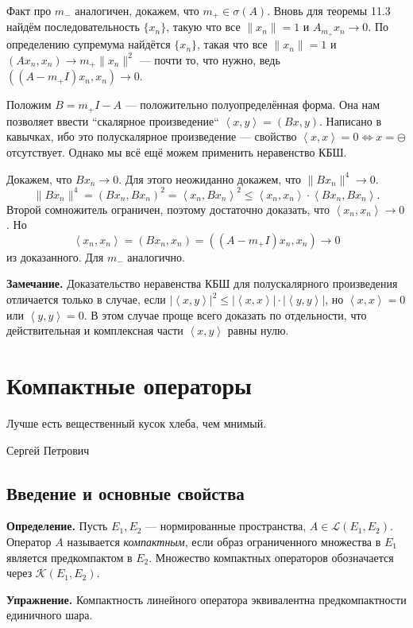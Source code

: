 Факт про $m_-$ аналогичен, докажем, что $m_+ \in \sigma(A)$.
Вновь для теоремы 11.3 найдём последовательность $\{x_n\}$, такую что все $\|x_n\| = 1$ и $A_{m_+} x_n \to 0$.
По определению супремума найдётся $\{x_n\}$, такая что все $\|x_n\| = 1$ и $(Ax_n, x_n) \to m_+ \|x_n\|^2$ --- почти то, что нужно, ведь $((A - m_+ I) x_n, x_n) \to 0$.

Положим $B = m_+ I - A$ --- положительно полуопределённая форма.
Она нам позволяет ввести ``скалярное произведение`` $\left<x, y \right> = (Bx, y)$.
Написано в кавычках, ибо это полускалярное произведение --- свойство $\left<x, x \right> = 0 \iff x = \ominus$ отсутствует.
Однако мы всё ещё можем применить неравенство КБШ.

Докажем, что $Bx_n \to 0$.
Для этого неожиданно докажем, что $\|Bx_n\|^4 \to 0$.
\[
    \|Bx_n\|^4 = (Bx_n, Bx_n)^2 = \left<x_n, Bx_n \right>^2 \le \left<x_n, x_n \right> \cdot \left<Bx_n, Bx_n \right>.
\]
Второй сомножитель ограничен, поэтому достаточно доказать, что $\left<x_n, x_n \right> \to 0$.
Но 
\[
    \left<x_n, x_n \right> = (Bx_n, x_n) = ((A - m_+I)x_n, x_n) \to 0
\]
из доказанного.
Для $m_-$ аналогично.

\QED

\textbf{Замечание.} Доказательство неравенства КБШ для полускалярного произведения отличается только в случае, если $|\left<x, y \right>|^2 \le |\left<x, x \right>| \cdot |\left<y, y \right>|$, но $\left<x, x \right> = 0$ или $\left<y, y \right> = 0$.
В этом случае проще всего доказать по отдельности, что действительная и комплексная части $\left<x, y \right>$ равны нулю.

\section{Компактные операторы}
\epigraph{Лучше есть вещественный кусок хлеба, чем мнимый.}{Сергей Петрович}

\subsection{Введение и основные свойства}

\textbf{Определение.} Пусть $E_1, E_2$ --- нормированные пространства, $A \in \mathcal L(E_1, E_2)$.
Оператор $A$ называется \textit{компактным}, если образ ограниченного множества в $E_1$ является предкомпактом в $E_2$.
Множество компактных операторов обозначается через $\mathcal K(E_1, E_2)$.

\textbf{Упражнение.} Компактность линейного оператора эквивалентна предкомпактности единичного шара.

